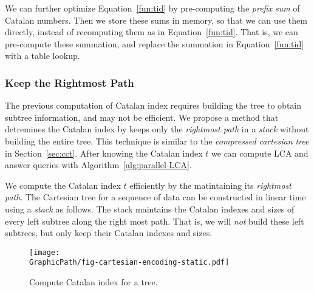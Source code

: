 % 



We can further optimize Equation~\ref{fun:tid} by pre-computing the
{\em prefix sum} of Catalan numbers.  Then we store these sums in
memory, so that we can use them directly, instead of recomputing them
as in Equation~\ref{fun:tid}.  That is, we can pre-compute these
summation, and replace the summation in Equation~\ref{fun:tid} with a
table lookup.


\subsubsection{Keep the Rightmost Path}

The previous computation of Catalan index requires building the tree
to obtain subtree information, and may not be efficient.  We propose a
method that detremines the Catalan index by keeps only the {\em
  rightmost path} in a {\em stack} without building the entire tree.
This technique is similar to the {\em compressed cartesian tree} in
Section~\ref{sec:cct}.  After knowing the Catalan index $t$ we can
compute LCA and answer queries with Algorithm~\ref{alg:parallel-LCA}.

We compute the Catalan index $t$ efficiently by the matintaining its
{\em rightmost path}.  The Cartesian tree for a sequence of data can
be constructed in linear time using a {\em stack} as follows.  The
stack maintains the Catalan indexes and sizes of every left subtree
along the right most path.  That is, we will {\em not} build these
left subtrees, but only keep their Catalan indexes and sizes.

\begin{figure}[!thb]
  \centering
  \texttt{[image: \\GraphicPath/fig-cartesian-encoding-static.pdf]}
  \caption{Compute Catalan index for a tree.}
  \label{fig:fig-cartesian-encoding-static}
\end{figure}


